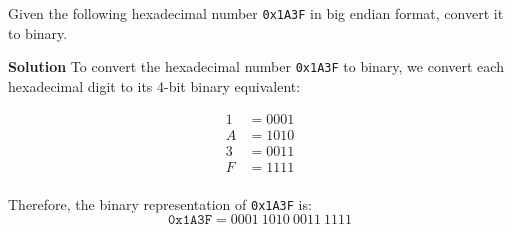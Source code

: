 Given the following hexadecimal number \texttt{0x1A3F} in big endian format, convert it to binary.

\textbf{Solution}
To convert the hexadecimal number \texttt{0x1A3F} to binary, we convert each hexadecimal digit to its 4-bit binary equivalent:

\begin{align*}
1 & = 0001 \\
A & = 1010 \\
3 & = 0011 \\
F & = 1111 \\
\end{align*}

Therefore, the binary representation of \texttt{0x1A3F} is:
\[
\texttt{0x1A3F} = 0001\ 1010\ 0011\ 1111
\]